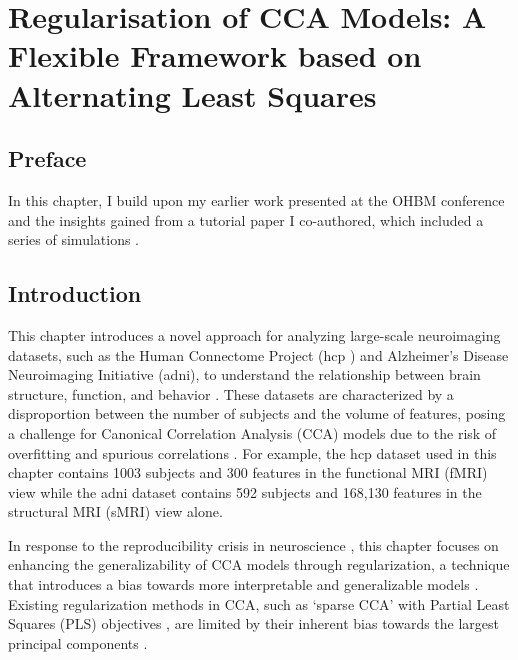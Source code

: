\graphicspath{{chapters/regularisation}}


\chapter{Regularisation of CCA Models: A Flexible Framework based on Alternating Least Squares}\label{ch:als}

\minitoc
\section*{Preface}

In this chapter, I build upon my earlier work presented at the OHBM conference and the insights gained from a tutorial paper I co-authored, which included a series of simulations \citep{mihalik2022canonical}.

\section{Introduction}\label{sec:introduction}

This chapter introduces a novel approach for analyzing large-scale neuroimaging datasets, such as the Human Connectome Project (\acrshort{hcp} \citep{van2013wu}) and Alzheimer's Disease Neuroimaging Initiative (\acrshort{adni}), to understand the relationship between brain structure, function, and behavior \citep{SMITH2018263,BZDOK2017549,wang2020finding}.
These datasets are characterized by a disproportion between the number of subjects and the volume of features, posing a challenge for Canonical Correlation Analysis (CCA) models due to the risk of overfitting and spurious correlations \citep{wang2018finding}.
For example, the \acrshort{hcp} dataset used in this chapter contains 1003 subjects and 300 features in the functional MRI (fMRI) view while the \acrshort{adni} dataset contains 592 subjects and  168,130 features in the structural MRI (sMRI) view alone.

In response to the reproducibility crisis in neuroscience \citep{button2013power}, this chapter focuses on enhancing the generalizability of CCA models through regularization, a technique that introduces a bias towards more interpretable and generalizable models \citep{engl1996regularisation,bzdok2019towards}.
Existing regularization methods in CCA, such as `sparse CCA' with Partial Least Squares (PLS) objectives \citep{le2008sparse,witten2009penalized,lindenbaum2021l0}, are limited by their inherent bias towards the largest principal components \citep{mihalik_canonical_2022}.

